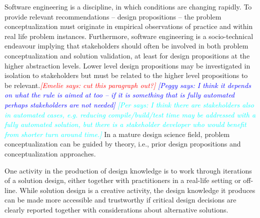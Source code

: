 \documentclass[graybox]{svmult}
\newcommand{\emelie}[1]{\textcolor{red}{{\it [Emelie says: #1]}}}
\newcommand{\peggy}[1]{\textcolor{blue}{{\it [Peggy says: #1]}}}
\newcommand{\per}[1]{\textcolor{cyan}{{\it [Per says: #1]}}}
\newcommand{\emelie}[1]{}
\newcommand{\peggy}[1]{}
\newcommand{\per}[1]{}
\begin{document}
Software engineering is a discipline, in which conditions are changing rapidly. To provide relevant recommendations -- design propositions --  the problem conceptualization must originate in empirical observations of practice and within real life problem instances. Furthermore, software engineering is a socio-technical endeavour implying that stakeholders should often be involved in both problem conceptualization and solution validation, at least for design propositions at the higher abstraction levels. Lower level design propositions may be investigated in isolation to stakeholders but must be related to the higher level propositions to be relevant.\emelie{cut this paragraph out?} 
\peggy{I think it depends on what the rule is aimed at too -- if it is something that is fully automated perhaps stakeholders are not needed} \per{I think there are stakeholders also in automated cases, e.g. reducing compile/build/test time may be addressed with a fully automated solution, but there is a stakeholder developer who would benefit from shorter turn around time.}
In a mature design science field, problem conceptualization can be guided by theory, i.e., prior design propositions and conceptualization approaches. 


One activity in the production of design knowledge is to work through iterations of a solution design, either together with practitioners in a real-life setting or off-line. 
While solution design is a creative activity, the design knowledge it produces can be made more accessible and trustworthy if critical design decisions are clearly reported together with considerations about alternative solutions.

\end{document}
